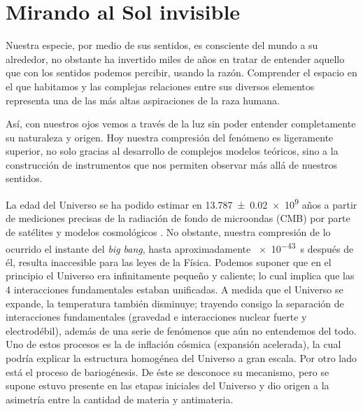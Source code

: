 \pagestyle{fancy}
\chapter{Mirando al Sol invisible}
\label{chap:uno}

Nuestra especie, por medio de sus sentidos, es consciente del mundo a su alrededor, no obstante ha invertido miles de años en tratar de entender aquello que con los sentidos podemos percibir, usando la razón. Comprender el espacio en el que habitamos y las complejas relaciones entre sus diversos elementos representa una de las más altas aspiraciones de la raza humana.

Así, con nuestros ojos vemos a través de la luz sin poder entender completamente su naturaleza y origen. Hoy nuestra compresión del fenómeno es ligeramente superior, no solo gracias al desarrollo de complejos modelos teóricos, sino a la construcción de instrumentos que nos permiten observar más allá de nuestros sentidos.

La edad del Universo se ha podido estimar en \num{13.787(20)e9} años a partir de mediciones precisas de la radiación de fondo de microondas (CMB) por parte de satélites y modelos cosmológicos \cite{plank18}. No obstante, nuestra compresión de lo ocurrido el instante del \emph{big bang}, hasta aproximadamente \SI{e-43}{\second} después de él, resulta inaccesible para las leyes de la Física. Podemos suponer que en el principio el Universo era infinitamente pequeño y caliente; lo cual implica que las \num{4} interacciones fundamentales estaban unificadas. A medida que el Universo se expande, la temperatura también disminuye; trayendo consigo la separación de interacciones fundamentales (gravedad e interacciones nuclear fuerte y electrodébil), además de una serie de fenómenos que aún no entendemos del todo. Uno de estos procesos es la de inflación cósmica (expansión acelerada), la cual podría explicar la estructura homogénea del Universo a gran escala. Por otro lado está el proceso de bariogénesis. De éste se desconoce su mecanismo, pero se supone estuvo presente en las etapas iniciales del Universo y dio origen a la asimetría entre la cantidad de materia y antimateria.

